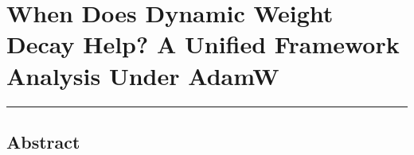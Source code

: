 \documentclass[
]{article}
\author{}
\date{}
\begin{document}
\hypertarget{when-does-dynamic-weight-decay-help-a-unified-framework-analysis-under-adamw}{%
\section{When Does Dynamic Weight Decay Help? A Unified Framework
Analysis Under
AdamW}\label{when-does-dynamic-weight-decay-help-a-unified-framework-analysis-under-adamw}}

\begin{center}\rule{0.5\linewidth}{0.5pt}\end{center}

\hypertarget{abstract}{%
\subsection{Abstract}\label{abstract}}
\end{document}
